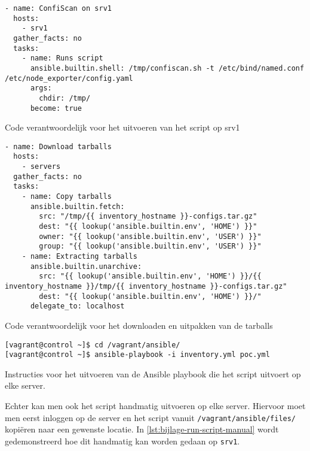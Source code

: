 \begin{listing}
  \begin{verbatim}
- name: ConfiScan on srv1
  hosts:
    - srv1
  gather_facts: no
  tasks:
    - name: Runs script
      ansible.builtin.shell: /tmp/confiscan.sh -t /etc/bind/named.conf /etc/node_exporter/config.yaml
      args:
        chdir: /tmp/
      become: true
    \end{verbatim}
    \caption[Uitvoeren van script op \texttt{srv1}.]{Code verantwoordelijk voor het uitvoeren van het script op srv1}
    \label{lst:bijlage-run-script}
\end{listing}

\begin{listing}
  \begin{verbatim}
- name: Download tarballs
  hosts:
    - servers
  gather_facts: no
  tasks:
    - name: Copy tarballs
      ansible.builtin.fetch:
        src: "/tmp/{{ inventory_hostname }}-configs.tar.gz"
        dest: "{{ lookup('ansible.builtin.env', 'HOME') }}"
        owner: "{{ lookup('ansible.builtin.env', 'USER') }}"
        group: "{{ lookup('ansible.builtin.env', 'USER') }}"
    - name: Extracting tarballs
      ansible.builtin.unarchive:
        src: "{{ lookup('ansible.builtin.env', 'HOME') }}/{{ inventory_hostname }}/tmp/{{ inventory_hostname }}-configs.tar.gz"
        dest: "{{ lookup('ansible.builtin.env', 'HOME') }}/"
      delegate_to: localhost
  \end{verbatim}
  \caption[Downloaden en uitpakken van tarballs.]{Code verantwoordelijk voor het downloaden en uitpakken van de tarballs}
  \label{lst:bijlage-tarballs}
\end{listing}

\begin{listing}
  \begin{verbatim}
[vagrant@control ~]$ cd /vagrant/ansible/
[vagrant@control ~]$ ansible-playbook -i inventory.yml poc.yml
  \end{verbatim}
  \caption[Uitvoeren van Ansible playbook.]{Instructies voor het uitvoeren van de Ansible playbook die het script uitvoert op elke server.}
  \label{lst:bijlage-run-playbook}
\end{listing}

Echter kan men ook het script handmatig uitvoeren op elke server.
Hiervoor moet men eerst inloggen op de server en het script vanuit \texttt{/vagrant/ansible/files/} kopi\"eren naar een gewenste locatie.
In \ref{lst:bijlage-run-script-manual} wordt gedemonstreerd hoe dit handmatig kan worden gedaan op \texttt{srv1}.

